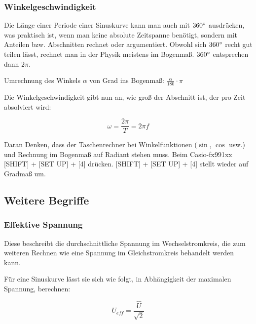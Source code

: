 \subsubsection{Winkelgeschwindigkeit}

Die Länge einer Periode einer Sinuskurve kann man auch mit $360\degree$ ausdrücken, was praktisch ist, wenn man keine absolute Zeitspanne benötigt, sondern mit Anteilen bzw. Abschnitten rechnet oder argumentiert. Obwohl sich $360\degree$ recht gut teilen lässt, rechnet man in der Physik meistens im Bogenmaß. $360\degree$ entsprechen dann $2\pi$.

\begin{NiceToKnow}
Umrechnung des Winkels $\alpha$ von Grad ins Bogenmaß: $\frac{\alpha}{180} \cdot \pi$
\end{NiceToKnow}

Die Winkelgeschwindigkeit gibt nun an, wie groß der Abschnitt ist, der pro Zeit absolviert wird:

\begin{equation}	\label{eq:Winkelgeschwindigkeit}
	\omega = \frac{2\pi}{T} = 2\pi f
\end{equation}

\begin{Wichtig}
Daran Denken, dass der Taschenrechner bei Winkelfunktionen ($\sin$, $\cos$ usw.) und Rechnung im Bogenmaß auf \glqq Radiant\grqq{} stehen muss. Beim Casio-fx991xx [SHIFT] + [SET UP] + [4] drücken. [SHIFT] + [SET UP] + [4] stellt wieder auf Gradmaß um.
\end{Wichtig}


\subsection{Weitere Begriffe}	\label{subsec:ErlaeuterungenWeitere}

\subsubsection{Effektive Spannung}

Diese beschreibt die durchschnittliche Spannung im Wechselstromkreis, die zum weiteren Rechnen wie eine Spannung im Gleichstromkreis behandelt werden kann.

Für eine Sinuskurve lässt sie sich wie folgt, in Abhängigkeit der maximalen Spannung, berechnen:

\begin{equation}	\label{eq:EffektiveSpannung}
	U_{eff}=\frac{\hat{U}}{\sqrt{2}}
\end{equation}


